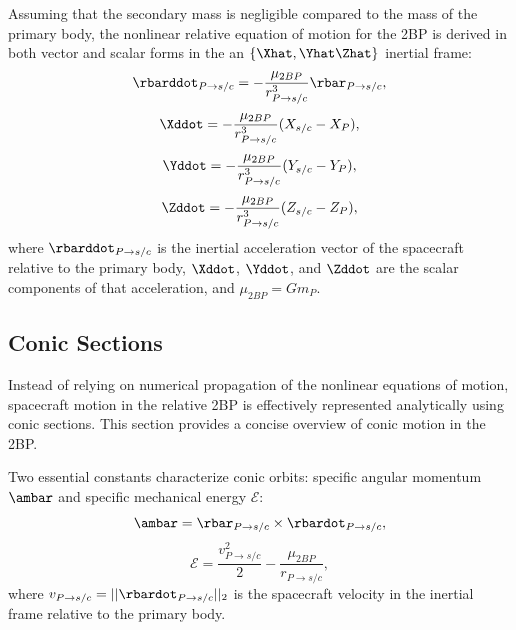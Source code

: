 Assuming that the secondary mass is negligible compared to the mass of the primary body, the
nonlinear relative equation of motion for the 2BP is derived in both vector and scalar forms in the
an $\{\Xhat,\Yhat\Zhat\}$ inertial frame\cite{Vallado:2013,Canales:2021b}:
\begin{equation}
    \rbarddot_{P\rightarrow s/c}=-\frac{\mu_{2BP}}{r_{P\rightarrow s/c}^{3}}\rbar_{P\rightarrow s/c},
    \label{eq:TBPEoM}
\end{equation}
\begin{equation}
    \Xddot=-\frac{\mu_{2BP}}{r_{P\rightarrow s/c}^{3}}(X_{s/c}-X_{P}),
    \label{eq:TBPEoMX}
\end{equation}
\begin{equation}
    \Yddot=-\frac{\mu_{2BP}}{r_{P\rightarrow s/c}^{3}}(Y_{s/c}-Y_{P}),
    \label{eq:TBPEoMY}
\end{equation}
\begin{equation}
    \Zddot=-\frac{\mu_{2BP}}{r_{P\rightarrow s/c}^{3}}(Z_{s/c}-Z_{P}),
    \label{eq:TBPEoMZ}
\end{equation}
where $\rbarddot_{P\rightarrow s/c}$ is the inertial acceleration vector of the spacecraft relative
to the primary body, $\Xddot$, $\Yddot$, and $\Zddot$ are the scalar components of that
acceleration, and $\mu_{2BP}=Gm_{P}$.

\subsection{Conic Sections}
Instead of relying on numerical propagation of the nonlinear equations of motion, spacecraft motion
in the relative 2BP is effectively represented analytically using conic sections. This section
provides a concise overview of conic motion in the 2BP.

Two essential constants characterize conic orbits: specific angular momentum $\ambar$ and specific
mechanical energy $\mathcal{E}$:
\begin{equation}
    \ambar=\rbar_{P\rightarrow s/c}\times\rbardot_{P\rightarrow s/c},
    \label{eq:angularmomentum}
\end{equation}
\begin{equation}
    \mathcal{E}=\frac{v_{P\rightarrow s/c}^{2}}{2}-\frac{\mu_{2BP}}{r_{P\rightarrow s/c}},
    \label{eq:energy}
\end{equation}
where $v_{P\rightarrow s/c}=||\rbardot_{P\rightarrow s/c}||_{2}$ is the spacecraft velocity in the
inertial frame relative to the primary body.

